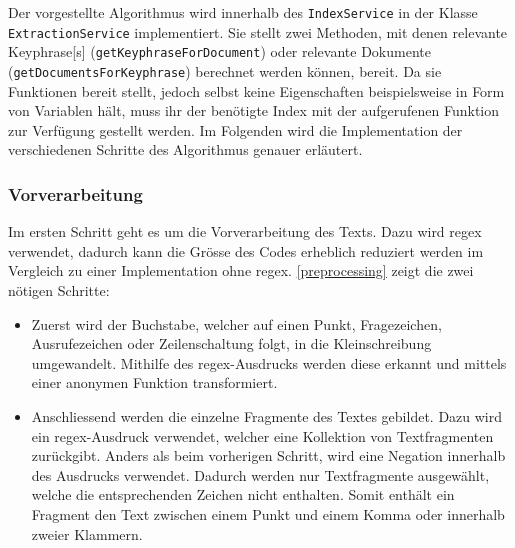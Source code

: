 

Der vorgestellte Algorithmus wird innerhalb des \texttt{IndexService} in der Klasse \texttt{ExtractionService} implementiert. Sie stellt zwei Methoden, mit denen relevante \gls{Keyphrase}[s] (\texttt{getKeyphraseForDocument}) oder relevante Dokumente (\texttt{getDocumentsForKeyphrase}) berechnet werden können, bereit. Da sie Funktionen bereit stellt, jedoch selbst keine Eigenschaften beispielsweise in Form von Variablen hält, muss ihr der benötigte Index mit der aufgerufenen Funktion zur Verfügung gestellt werden. 
Im Folgenden wird die Implementation der verschiedenen Schritte des Algorithmus genauer erläutert.


\subsubsection{Vorverarbeitung}


Im ersten Schritt geht es um die Vorverarbeitung des Texts. Dazu wird \gls{regex} verwendet, dadurch kann die Grösse des Codes erheblich reduziert werden im Vergleich zu einer Implementation ohne \gls{regex}. \autoref{preprocessing} zeigt die zwei nötigen Schritte:
\begin{itemize}
    \item Zuerst wird der Buchstabe, welcher auf einen Punkt, Fragezeichen, Ausrufezeichen oder Zeilenschaltung folgt, in die Kleinschreibung umgewandelt. Mithilfe des \gls{regex}-Ausdrucks werden diese erkannt und mittels einer anonymen Funktion transformiert.
    \item Anschliessend werden die einzelne Fragmente des Textes gebildet. Dazu wird ein \gls{regex}-Ausdruck verwendet, welcher eine Kollektion von Textfragmenten zurückgibt. Anders als beim vorherigen Schritt, wird eine Negation innerhalb des Ausdrucks verwendet. Dadurch werden nur Textfragmente ausgewählt, welche die entsprechenden Zeichen nicht enthalten. Somit enthält ein Fragment den Text zwischen einem Punkt und einem Komma oder innerhalb zweier Klammern. 
\end{itemize}


